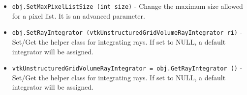 \begin{itemize}
\item  \verb|obj.SetMaxPixelListSize (int size)| -  Change the maximum size allowed for a pixel list. It is an advanced
 parameter.
 

\item  \verb|obj.SetRayIntegrator (vtkUnstructuredGridVolumeRayIntegrator ri)| -  Set/Get the helper class for integrating rays.  If set to NULL, a
 default integrator will be assigned.

\item  \verb|vtkUnstructuredGridVolumeRayIntegrator = obj.GetRayIntegrator ()| -  Set/Get the helper class for integrating rays.  If set to NULL, a
 default integrator will be assigned.

\end{itemize}
